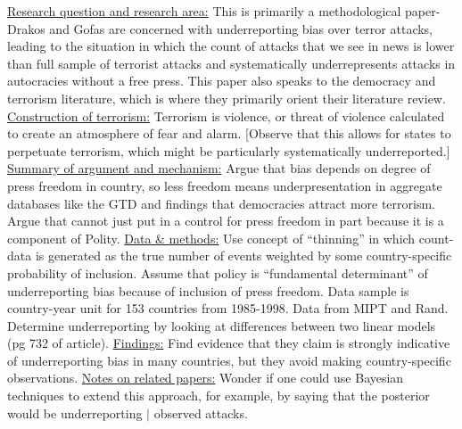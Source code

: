 \documentclass{article}[12pt]
\begin{document}
\underline{Research question and research area:} This is primarily a methodological paper- Drakos and Gofas are concerned with underreporting bias over terror attacks, leading to the situation in which the count of attacks that we see in news is lower than full sample of terrorist attacks and systematically underrepresents attacks in autocracies without a free press. This paper also speaks to the democracy and terrorism literature, which is where they primarily orient their literature review.
\underline{Construction of terrorism:} Terrorism is violence, or threat of violence calculated to create an atmosphere of fear and alarm. [Observe that this allows for states to perpetuate terrorism, which might be particularly systematically underreported.] 
\underline{Summary of argument and mechanism:} Argue that bias depends on degree of press freedom in country, so less freedom means underpresentation in aggregate databases like the GTD and findings that democracies attract more terrorism. Argue that cannot just put in a control for press freedom in part because it is a component of Polity.
\underline{Data \& methods:} Use concept of ``thinning'' in which count-data is generated as the true number of events weighted by some country-specific probability of inclusion. Assume that policy is ``fundamental determinant'' of underreporting bias because of inclusion of press freedom. Data sample is country-year unit for 153 countries from 1985-1998. Data from MIPT and Rand. Determine underreporting by looking at differences between two linear models (pg 732 of article).
\underline{Findings:} Find evidence that they claim is strongly indicative of underreporting bias in many countries, but they avoid making country-specific observations.
\underline{Notes on related papers:} Wonder if one could use Bayesian techniques to extend this approach, for example, by saying that the posterior would be underreporting $|$ observed attacks. 
\end{document}
